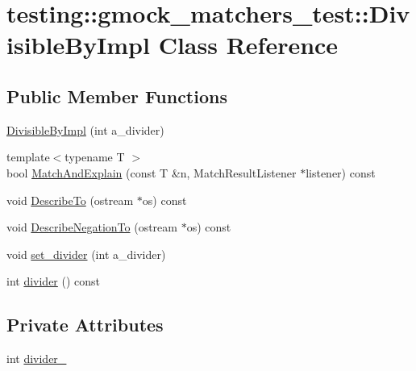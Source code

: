 \hypertarget{classtesting_1_1gmock__matchers__test_1_1_divisible_by_impl}{}\section{testing\+::gmock\+\_\+matchers\+\_\+test\+::Divisible\+By\+Impl Class Reference}
\label{classtesting_1_1gmock__matchers__test_1_1_divisible_by_impl}
\subsection*{Public Member Functions}
\begin{DoxyCompactItemize}
\item 
\mbox{\hyperlink{classtesting_1_1gmock__matchers__test_1_1_divisible_by_impl_aab5d8d383a8cbf112fe087c4f0f3f699}{Divisible\+By\+Impl}} (int a\+\_\+divider)
\item 
{\footnotesize template$<$typename T $>$ }\\bool \mbox{\hyperlink{classtesting_1_1gmock__matchers__test_1_1_divisible_by_impl_a2621df4b34315b327e20b6f4d901417d}{Match\+And\+Explain}} (const T \&n, Match\+Result\+Listener $\ast$listener) const
\item 
void \mbox{\hyperlink{classtesting_1_1gmock__matchers__test_1_1_divisible_by_impl_aabd14d5f96ef6851141d9ed9fbee3f86}{Describe\+To}} (ostream $\ast$os) const
\item 
void \mbox{\hyperlink{classtesting_1_1gmock__matchers__test_1_1_divisible_by_impl_a9c061ef411c126c604d4c33d92911d50}{Describe\+Negation\+To}} (ostream $\ast$os) const
\item 
void \mbox{\hyperlink{classtesting_1_1gmock__matchers__test_1_1_divisible_by_impl_a86c8787ab835bc84a9ad7e3931d644cc}{set\+\_\+divider}} (int a\+\_\+divider)
\item 
int \mbox{\hyperlink{classtesting_1_1gmock__matchers__test_1_1_divisible_by_impl_afaf102bc25623966dd11805b62e42321}{divider}} () const
\end{DoxyCompactItemize}
\subsection*{Private Attributes}
\begin{DoxyCompactItemize}
\item 
int \mbox{\hyperlink{classtesting_1_1gmock__matchers__test_1_1_divisible_by_impl_a9110419e34b81fd67f07810366a1f0bc}{divider\+\_\+}}
\end{DoxyCompactItemize}


